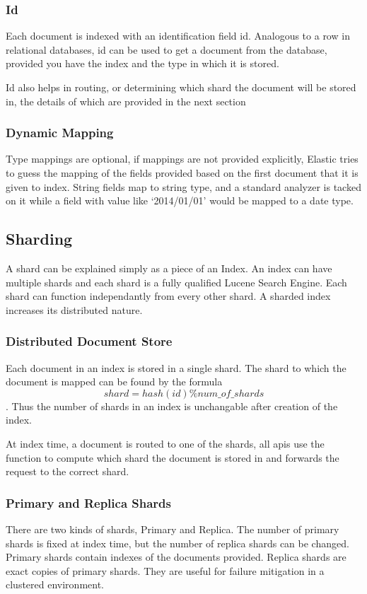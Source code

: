 \documentclass[12pt]{article}
\begin{document}
			\subsubsection{Id}
			Each document is indexed with an identification field id. Analogous to a row in relational databases, id can be used to get a document from the database, provided you have the index and the type in which it is stored. 

			Id also helps in routing, or determining which shard the document will be stored in, the details of which are provided in the next section

			\subsubsection{Dynamic Mapping}
			Type mappings are optional, if mappings are not provided explicitly, Elastic tries to guess the mapping of the fields provided based on the first document that it is given to index. String fields map to string type, and a standard analyzer is tacked on it while a field with value like `2014/01/01' would be mapped to a date type.

		\subsection{Sharding}
			A shard can be explained simply as a piece of an Index. An index can have multiple shards and each shard is a fully qualified Lucene Search Engine. Each shard can function independantly from every other shard. A sharded index increases its distributed nature.
			\subsubsection{Distributed Document Store}
				Each document in an index is stored in a single shard. The shard to which the document is mapped can be found by the formula \[ shard = hash(id) \% num\_of\_shards\]. Thus the number of shards in an index is unchangable after creation of the index.

				At index time, a document is routed to one of the shards, all \ac{api}s use the function to compute which shard the document is stored in and forwards the request to the correct shard.
			\subsubsection{Primary and Replica Shards}
				There are two kinds of shards, Primary and Replica. The number of primary shards is fixed at index time, but the number of replica shards can be changed. Primary shards contain indexes of the documents provided. Replica shards are exact copies of primary shards. They are useful for failure mitigation in a clustered environment.
\end{document}
